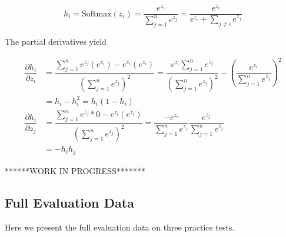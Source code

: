 \documentclass[pageno]{jpaper}
\begin{document}
\begin{equation}
    \label{eq: output layer value}
    h_i = \text{Softmax}(z_i) = \dfrac{e^{z_i}}{\sum\limits_{j=1}^n e^{z_j}} = \dfrac{e^{z_i}}
    {e^{z_i} + \sum\limits_{j\neq i} e^{z_j}}
\end{equation}

The partial derivatives yield

\begin{equation}
    \label{eq: output partials}
    \begin{aligned}
        \dfrac{\partial h_i}{\partial z_i} &= \dfrac{\sum\limits_{j=1}^n e^{z_j}(e^{z_i}) - e^{z_i}(e^{z_i})}
        {\left( \sum\limits_{j=1}^n e^{z_j} \right)^2}
        = \dfrac{e^{z_i}\sum\limits_{j=1}^n e^{z_j}}{\left( \sum\limits_{j=1}^n e^{z_j} \right)^2}
        - \left( \dfrac{e^{z_i}}{ \sum\limits_{j=1}^n e^{z_j} } \right)^2 \\
        &= h_i - h_i^2
        = h_i\left( 1 - h_i \right) \\
        \dfrac{\partial h_i}{\partial z_j} &= \dfrac{\sum\limits_{j=1}^n e^{z_j}*0 - e^{z_i}(e^{z_i})}
        {\left( \sum\limits_{j=1}^n e^{z_j} \right)^2}
        = \dfrac{-e^{z_i}}{\sum\limits_{j=1}^n e^{z_j}}\dfrac{e^{z_j}}{\sum\limits_{j=1}^n e^{z_j}} \\
        &= -h_ih_j
    \end{aligned}
\end{equation}

******WORK IN PROGRESS*******

\subsection{Full Evaluation Data}
\label{Full Evaluation Data}
Here we present the full evaluation data on three practice tests.
\end{document}
